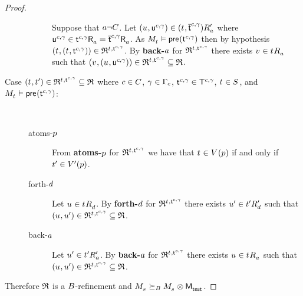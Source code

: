 \begin{proof}
\begin{description}
\begin{description}
                Suppose that $\agentA \neg \agentsC$.
                Let $(\kStateU, \aStateU[\agentC, \gamma]) \in \kSuccessorsPA{(\kStateT, \aPStateT[\agentC, \gamma])}$ where $\aStateU[\agentC, \gamma] \in \aSuccessorsA{\aStateT[\agentC, \gamma]} = \aSuccessorsA{\aPStateT[\agentC, \gamma]}$.
                As $\kPModel{\kStateT} \entails \aPrecondition(\aStateT[\agentC, \gamma])$ then by hypothesis $(\kStateT, (\kStateT, \aStateT[\agentC, \gamma])) \in \refinement^{\kStateT, \aStateT[\agentC, \gamma]}$.
                By {\bf back-$\agentA$} for $\refinement^{\kStateT, \aStateT[\agentC, \gamma]}$ there exists $\kStateV \in \kSuccessorsA{\kStateT}$ such that $(\kStateV, (\kStateU, \aStateU[\agentC, \gamma])) \in \refinement^{\kStateT, \aStateT[\agentC, \gamma]} \subseteq \refinement$.
        \end{description}
    \item[{Case $(\kStateT, \kStateTP) \in \refinement^{\kStateT, \aStateT[\agentC, \gamma]} \subseteq \refinement$ where $\agentC \in \agentsC$, $\gamma \in \Gamma_\agentC$, $\aStateT[\agentC, \gamma] \in \aStatesT[\agentC, \gamma]$, $\kStateT \in \kStates$, and $\kPModel{\kStateT} \entails \aPrecondition(\aStateT[\agentC, \gamma])$:}] \hfill \\
        \begin{description}
            \item[atoms-$\atomP$]
                From {\bf atoms-$\atomP$} for $\refinement^{\kStateT, \aStateT[\agentC, \gamma]}$ we have that $\kStateT \in \kValuation(\atomP)$ if and only if $\kStateTP \in \kValuationP(\atomP)$.
            \item[forth-$\agentD$]
                Let $\kStateU \in \kSuccessorsD{\kStateT}$.
                By {\bf forth-$\agentD$} for $\refinement^{\kStateT, \aStateT[\agentC, \gamma]}$ there exists $\kStateUP \in \kSuccessorsPD{\kStateTP}$ such that $(\kStateU, \kStateUP) \in \refinement^{\kStateT, \aStateT[\agentC, \gamma]} \subseteq \refinement$.
            \item[back-$\agentA$]
                Let $\kStateUP \in \kSuccessorsPA{\kStateTP}$.
                By {\bf back-$\agentA$} for $\refinement^{\kStateT, \aStateT[\agentC, \gamma]}$ there exists $\kStateU \in \kSuccessorsA{\kStateT}$ such that $(\kStateU, \kStateUP) \in \refinement^{\kStateT, \aStateT[\agentC, \gamma]} \subseteq \refinement$.
        \end{description}
\end{description}

Therefore $\refinement$ is a $\agentsB$-refinement and $\kPModel{\kStateS} \simulatesBs \kPModel{\kStateS} \exec \aPModel{\aStateTest}$.
\end{proof}

